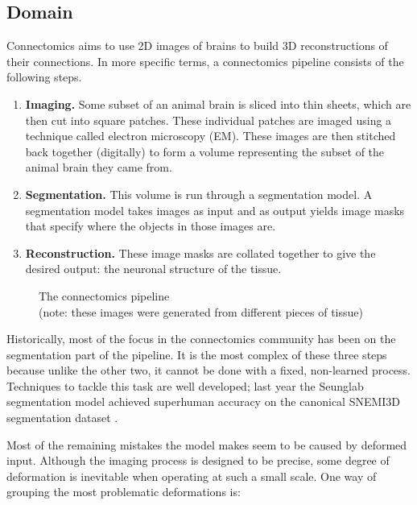 \documentclass[12pt,a4paper]{article}
\begin{document}
\subsection{Domain}

Connectomics aims to use 2D images of brains to build 3D reconstructions of their connections. In more specific terms, a connectomics pipeline consists of the following steps. 
\begin{enumerate} 
  \item {\bf Imaging.} Some subset of an animal brain is sliced into thin sheets, which are then cut into square patches. These individual patches are imaged using a technique called electron microscopy (EM). These images are then stitched back together (digitally) to form a volume representing the subset of the animal brain they came from. 
  \item {\bf Segmentation.} This volume is run through a segmentation model. A segmentation model takes images as input and as output yields image masks that specify where the objects in those images are. 
  \item {\bf Reconstruction.} These image masks are collated together to give the desired output: the neuronal structure of the tissue.
\end{enumerate}

\begin{figure}[ht]%
    \centering
	\qquad
    \qquad
    \caption{The connectomics pipeline \\(note: these images were generated from different pieces of tissue)}%
\end{figure}

Historically, most of the focus in the connectomics community has been on the segmentation part of the pipeline. It is the most complex of these three steps because unlike the other two, it cannot be done with a fixed, non-learned process. Techniques to tackle this task are well developed; last year the Seunglab segmentation model achieved superhuman accuracy on the canonical SNEMI3D segmentation dataset \cite{snemi}.

Most of the remaining mistakes the model makes seem to be caused by deformed input. Although the imaging process is designed to be precise, some degree of deformation is inevitable when operating at such a small scale. One way of grouping the most problematic deformations is:
\end{document}
